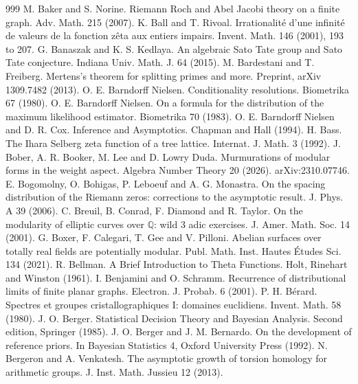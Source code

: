 \begin{thebibliography}{999}
 M. Baker and S. Norine. Riemann Roch and Abel Jacobi theory on a finite graph. Adv. Math. 215 (2007).
 K. Ball and T. Rivoal. Irrationalit\'e d'une infinit\'e de valeurs de la fonction z\^eta aux entiers impairs. Invent. Math. 146 (2001), 193 to 207.
 G. Banaszak and K. S. Kedlaya. An algebraic Sato Tate group and Sato Tate conjecture. Indiana Univ. Math. J. 64 (2015).
 M. Bardestani and T. Freiberg. Mertens's theorem for splitting primes and more. Preprint, arXiv 1309.7482 (2013).
 O. E. Barndorff Nielsen. Conditionality resolutions. Biometrika 67 (1980).
 O. E. Barndorff Nielsen. On a formula for the distribution of the maximum likelihood estimator. Biometrika 70 (1983).
 O. E. Barndorff Nielsen and D. R. Cox. Inference and Asymptotics. Chapman and Hall (1994).
 H. Bass. The Ihara Selberg zeta function of a tree lattice. Internat. J. Math. 3 (1992).
 J. Bober, A. R. Booker, M. Lee and D. Lowry Duda. Murmurations of modular forms in the weight aspect. Algebra Number Theory 20 (2026). arXiv:2310.07746.
 E. Bogomolny, O. Bohigas, P. Leboeuf and A. G. Monastra. On the spacing distribution of the Riemann zeros: corrections to the asymptotic result. J. Phys. A 39 (2006).
 C. Breuil, B. Conrad, F. Diamond and R. Taylor. On the modularity of elliptic curves over $\mathbb{Q}$: wild 3 adic exercises. J. Amer. Math. Soc. 14 (2001).
 G. Boxer, F. Calegari, T. Gee and V. Pilloni. Abelian surfaces over totally real fields are potentially modular. Publ. Math. Inst. Hautes \'Etudes Sci. 134 (2021).
 R. Bellman. A Brief Introduction to Theta Functions. Holt, Rinehart and Winston (1961).
 I. Benjamini and O. Schramm. Recurrence of distributional limits of finite planar graphs. Electron. J. Probab. 6 (2001).
 P. H. B\'erard. Spectres et groupes cristallographiques I: domaines euclidiens. Invent. Math. 58 (1980).
 J. O. Berger. Statistical Decision Theory and Bayesian Analysis. Second edition, Springer (1985).
 J. O. Berger and J. M. Bernardo. On the development of reference priors. In Bayesian Statistics 4, Oxford University Press (1992).
 N. Bergeron and A. Venkatesh. The asymptotic growth of torsion homology for arithmetic groups. J. Inst. Math. Jussieu 12 (2013).

\end{thebibliography}
